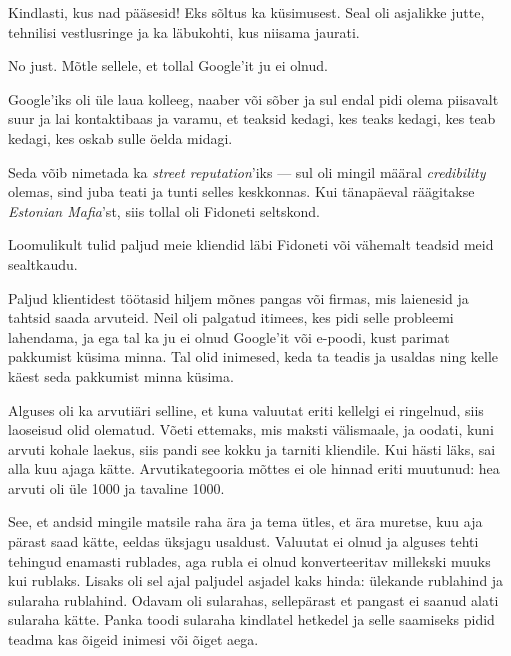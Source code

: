 
Kindlasti, kus nad pääsesid! Eks sõltus ka küsimusest. Seal oli asjalikke 
jutte, tehnilisi vestlusringe ja ka läbukohti, kus niisama jaurati.


No just. Mõtle sellele, et tollal Google'it ju ei olnud.

Google'iks oli üle laua kolleeg, naaber või sõber ja sul endal pidi olema 
piisavalt suur ja lai kontaktibaas ja varamu, et teaksid kedagi, kes 
teaks kedagi, kes teab kedagi, kes oskab sulle öelda midagi.


Seda võib nimetada ka \emph{street reputation}'iks --- sul oli mingil määral
\emph{credibility} olemas, sind juba teati ja tunti selles 
keskkonnas. Kui tänapäeval räägitakse \emph{Estonian Mafia}'st, siis tollal 
oli Fidoneti seltskond.

Loomulikult tulid paljud meie kliendid läbi Fidoneti või vähemalt teadsid 
meid sealtkaudu.

Paljud klientidest töötasid hiljem mõnes pangas või firmas, mis
laienesid ja tahtsid saada arvuteid. Neil oli palgatud itimees, 
kes pidi selle probleemi lahendama, ja ega tal ka ju ei olnud Google'it või 
e-poodi, kust parimat pakkumist küsima minna. Tal olid inimesed, keda 
ta teadis ja usaldas ning kelle käest seda pakkumist minna küsima.


Alguses oli ka arvutiäri selline, et kuna valuutat 
eriti kellelgi ei ringelnud, siis laoseisud olid olematud. 
Võeti ettemaks, mis maksti välismaale, ja oodati, 
kuni arvuti kohale laekus, siis pandi see kokku ja tarniti kliendile. Kui hästi 
läks, sai alla kuu ajaga kätte. Arvutikategooria mõttes ei ole
hinnad eriti muutunud: hea arvuti oli üle 1000 ja tavaline 1000.

See, et andsid mingile matsile raha ära ja tema ütles, et ära 
muretse, kuu aja pärast saad kätte, eeldas üksjagu usaldust. Valuutat 
ei olnud ja alguses tehti tehingud enamasti rublades, aga rubla ei olnud 
konverteeritav millekski muuks kui rublaks. Lisaks oli sel ajal paljudel 
asjadel kaks hinda: ülekande rublahind ja sularaha rublahind. Odavam oli 
sularahas, sellepärast et pangast ei saanud alati sularaha kätte. Panka toodi sularaha kindlatel hetkedel ja selle saamiseks pidid teadma kas 
õigeid inimesi või õiget aega.

